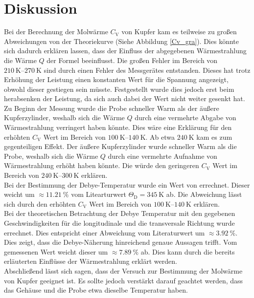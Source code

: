 \section{Diskussion} %
\label{sec:diskussion}

Bei der Berechnung der Molwärme $C_\mathrm{V}$ von Kupfer kam es teilweise zu großen Abweichungen von der Theoriekurve (Siehe Abbildung \ref{Cv_gra}). 
Dies könnte sich dadurch erklären lassen, dass der Einfluss der abgegebenen Wärmestrahlung die Wärme $Q$ der Formel beeinflusst.
Die großen Fehler im Bereich von $\SIrange{210}{270}{\kelvin}$ sind durch einen Fehler des Messgerätes entstanden.
Dieses hat trotz Erhöhung der Leistung einen konstanten Wert für die Spannung angezeigt, obwohl dieser gestiegen sein müsste.
Festgestellt wurde dies jedoch erst beim herabsenken der Leistung, da sich auch dabei der Wert nicht weiter gesenkt hat.\\

Zu Beginn der Messung wurde die Probe schneller Warm als der äußere Kupferzylinder, weshalb sich die Wärme $Q$ durch eine vermehrte Abgabe von Wärmestrahlung verringert haben könnte.
Dies wäre eine Erklärung für den erhöhten $C_\mathrm{V}$ Wert im Bereich von $\SIrange{100}{140}{\kelvin}$.
Ab etwa $\SI{240}{\kelvin}$ kam es zum gegenteiligen Effekt.
Der äußere Kupferzylinder wurde schneller Warm als die Probe, weshalb sich die Wärme $Q$ durch eine vermehrte Aufnahme von Wärmestrahlung erhöht haben könnte.
Die würde den geringeren $C_\mathrm{V}$ Wert im Bereich von $\SIrange{240}{300}{\kelvin}$ erklären.\\

Bei der Bestimmung der Debye-Temperatur wurde ein Wert von  errechnet.
Dieser weicht um $\approx \SI{11.21}{\percent}$ vom Litearturwert $\Theta_\mathrm{D} = \SI{345}{\kelvin}$ \cite{kupfer3} ab.
Die Abweichung lässt sich durch den erhöhten $C_\mathrm{V}$ Wert im Bereich von $\SIrange{100}{140}{\kelvin}$ erklären.\\

Bei der theoretischen Betrachtung der Debye Temperatur mit den gegebenen Geschwindigkeiten für die longitudinale und die transversale Richtung wurde  errechnet.
Dies entspricht einer Abweichung vom Literaturwert um $\approx \SI{3.92}{\percent}$. 
Dies zeigt, dass die Debye-Näherung hinreichend genaue Aussagen trifft.
Vom gemessenen Wert weicht dieser um $\approx \SI{7.89}{\percent}$ ab.
Dies kann durch die bereits erläuterten Einflüsse der Wärmestrahlung erklärt werden.\\

Abschließend lässt sich sagen, dass der Versuch zur Bestimmung der Molwärme von Kupfer geeignet ist.
Es sollte jedoch verstärkt darauf geachtet werden, dass das Gehäuse und die Probe etwa dieselbe Temperatur haben.